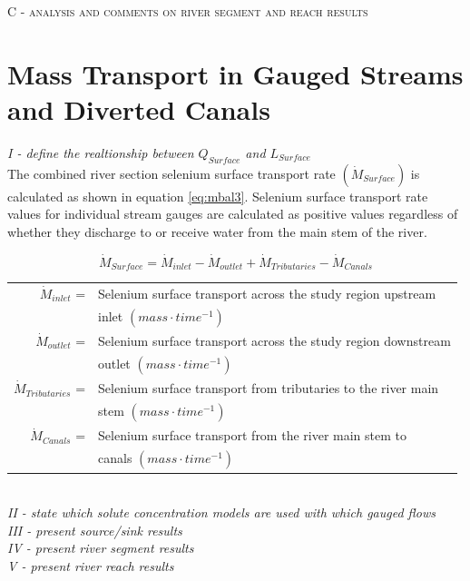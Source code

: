\begin{linenumbers}
\textsc{C - analysis and comments on river segment and reach results}

\clearpage{}
\section{Mass Transport in Gauged Streams and Diverted Canals}
\label{sec:MassTransport}

\emph{I - define the realtionship between $Q_{Surface}$ and $L_{Surface}$}\\

The combined river section selenium surface transport rate $(\dot{M}_{Surface})$ is calculated as shown in equation \ref{eq:mbal3}.  Selenium surface transport rate values for individual stream gauges are calculated as positive values regardless of whether they discharge to or receive water from the main stem of the river.

\begin{equation}
\dot{M}_{Surface}=\dot{M}_{inlet}-\dot{M}_{outlet}+\dot{M}_{Tributaries}-\dot{M}_{Canals}
\label{eq:mbal3}
\end{equation}
\begin{tabular}{rl}
$\dot{M}_{inlet}$ =& Selenium surface transport across the study region upstream \\
&inlet $(mass \cdot time^{-1})$\\
$\dot{M}_{outlet}$ =& Selenium surface transport across the study region downstream\\ 
&outlet $(mass \cdot time^{-1})$\\
$\dot{M}_{Tributaries}$ =& Selenium surface transport from tributaries to the river main\\
&stem $(mass \cdot time^{-1})$\\
$\dot{M}_{Canals}$ =& Selenium surface transport from the river main stem to\\
&canals $(mass \cdot time^{-1})$\\
\end{tabular}\\

\emph{II - state which solute concentration models are used with which gauged flows}\\

\emph{III - present source/sink results}\\

\emph{IV - present river segment results}\\

\emph{V - present river reach results}\\


\end{linenumbers}
